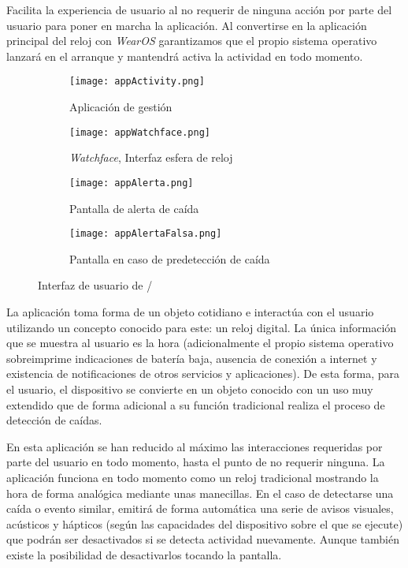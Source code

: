 Facilita la experiencia de usuario al no requerir de ninguna acción por parte del usuario para poner en marcha la aplicación. Al convertirse en la aplicación principal del reloj con  \textit{WearOS} garantizamos que el propio sistema operativo lanzará en el arranque y mantendrá activa la actividad en todo momento.

\begin{figure}[!ht]
  \centering
  \begin{subfigure}[b]{0.4\textwidth}
      \centering
      \texttt{[image: appActivity.png]}
      \caption{\footnotesize Aplicación de gestión}
      \label{fig:uiActivity}
  \end{subfigure}
  \hfill
  \begin{subfigure}[b]{0.4\textwidth}
      \centering
      \texttt{[image: appWatchface.png]}
      \caption{\footnotesize \textit{Watchface}, Interfaz esfera de reloj}
      \label{fig:uiWatchface}
  \end{subfigure}
  \begin{subfigure}[b]{0.4\textwidth}
      \centering
      \texttt{[image: appAlerta.png]}
      \caption{\footnotesize Pantalla de alerta de caída}
      \label{fig:uiAlerta}
  \end{subfigure}
  \hfill
  \begin{subfigure}[b]{0.4\textwidth}
      \centering
      \texttt{[image: appAlertaFalsa.png]}
      \caption{\footnotesize Pantalla en caso de predetección de caída}
      \label{fig:uiAlertaFalsa}
  \end{subfigure}
  \caption{\footnotesize \label{fig:ifell:UI} Interfaz de usuario de \ifell/}
\end{figure}


La aplicación toma forma de un objeto cotidiano e interactúa con el usuario utilizando un concepto conocido para este: un reloj digital. La única información que se muestra al usuario es la hora (adicionalmente el propio sistema operativo sobreimprime indicaciones de batería baja, ausencia de conexión a internet y existencia de notificaciones de otros servicios y aplicaciones). De esta forma, para el usuario, el dispositivo se convierte en un objeto conocido con un uso muy extendido que de forma adicional a su función tradicional realiza el proceso de detección de caídas.

En esta aplicación se han reducido al máximo las interacciones requeridas por parte del usuario en todo momento, hasta el punto de no requerir ninguna. La aplicación funciona en todo momento como un reloj tradicional mostrando la hora de forma analógica mediante unas manecillas. En el caso de detectarse una caída o evento similar, emitirá de forma automática una serie de avisos visuales, acústicos y hápticos (según las capacidades del dispositivo sobre el que se ejecute) que podrán ser desactivados si se detecta actividad nuevamente. Aunque también existe la posibilidad de desactivarlos tocando la pantalla.

